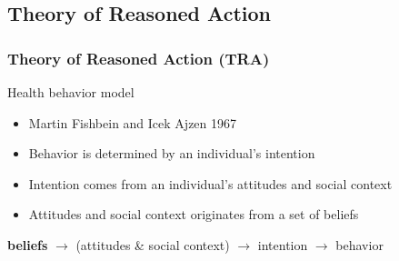 \documentclass[compress]{beamer}
\begin{document}
\subsection{Theory of Reasoned Action}

    \begin{frame}[Basic2]\frametitle{Theory of Reasoned Action (TRA)}
        Health behavior model

        \begin{itemize}
            \item Martin Fishbein and Icek Ajzen 1967
            \item Behavior is determined by an individual's intention
            \item Intention comes from an individual's attitudes and social context
            \item Attitudes and social context originates from a set of beliefs
        \end{itemize}
        
        \vspace{3mm}
        
        \textbf{beliefs} $\rightarrow$ (attitudes \& social context) $\rightarrow$ intention $\rightarrow$ behavior
        
    \end{frame}
    
    \begin{frame}[BlankLogo]
    \end{frame}
\end{document}
